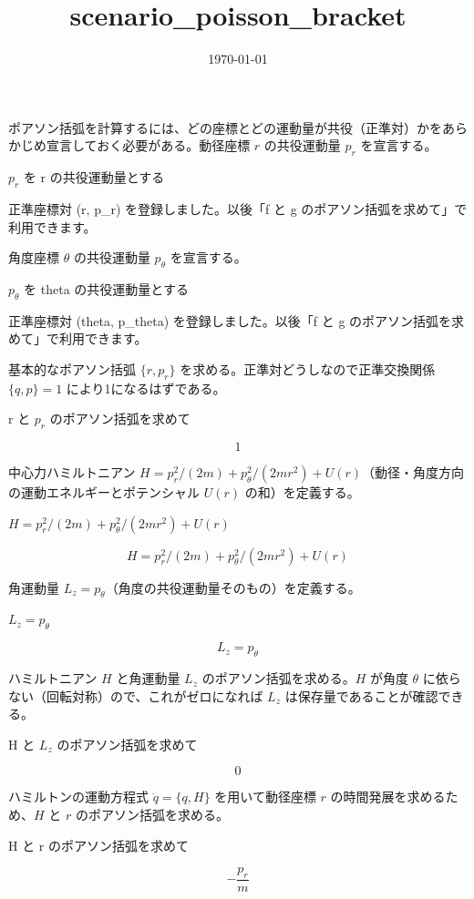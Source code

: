 \documentclass[dvipdfmx,a4paper,11pt]{jsarticle}
\title{scenario\_poisson\_bracket}
\date{\today}
\begin{document}
\maketitle

ポアソン括弧を計算するには、どの座標とどの運動量が共役（正準対）かをあらかじめ宣言しておく必要がある。動径座標 $r$ の共役運動量 $p_r$ を宣言する。

$p_r$ を r の共役運動量とする

正準座標対 (r, p\_r) を登録しました。以後「f と g のポアソン括弧を求めて」で利用できます。

角度座標 $\theta$ の共役運動量 $p_\theta$ を宣言する。

$p_{\theta}$ を theta の共役運動量とする

正準座標対 (theta, p\_theta) を登録しました。以後「f と g のポアソン括弧を求めて」で利用できます。

基本的なポアソン括弧 $\{r,p_r\}$ を求める。正準対どうしなので正準交換関係 $\{q,p\}=1$ により1になるはずである。

r と $p_r$ のポアソン括弧を求めて

\begin{equation}
  1
  \label{eq:E1}
\end{equation}

中心力ハミルトニアン $H=p_r^2/(2m)+p_\theta^2/(2mr^2)+U(r)$（動径・角度方向の運動エネルギーとポテンシャル $U(r)$ の和）を定義する。

$H = p_r^2/(2 m) + p_{\theta}^2/(2 m r^2) + U(r)$

\begin{equation}
  H = p_r^2/(2 m) + p_{\theta}^2/(2 m r^2) + U(r)
  \label{eq:E2}
\end{equation}

角運動量 $L_z=p_\theta$（角度の共役運動量そのもの）を定義する。

$L_z = p_{\theta}$

\begin{equation}
  L_z = p_{\theta}
  \label{eq:E3}
\end{equation}

ハミルトニアン $H$ と角運動量 $L_z$ のポアソン括弧を求める。$H$ が角度 $\theta$ に依らない（回転対称）ので、これがゼロになれば $L_z$ は保存量であることが確認できる。

H と $L_z$ のポアソン括弧を求めて

\begin{equation}
  0
  \label{eq:E4}
\end{equation}

ハミルトンの運動方程式 $\dot q=\{q,H\}$ を用いて動径座標 $r$ の時間発展を求めるため、$H$ と $r$ のポアソン括弧を求める。

H と r のポアソン括弧を求めて

\begin{equation}
  -\frac{p_{r}}{m}
  \label{eq:E5}
\end{equation}
\end{document}
